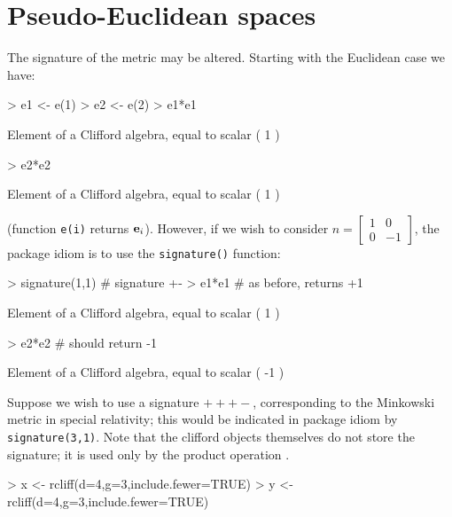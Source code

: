 \documentclass{birkjour}
\theoremstyle{definition}
\theoremstyle{remark}
\numberwithin{equation}{section}
\begin{document}
\section{Pseudo-Euclidean spaces}

The signature of the metric may be altered.  Starting with the
Euclidean case we have:
    
\begin{Schunk}
\begin{Sinput}
> e1 <- e(1)
> e2 <- e(2)
> e1*e1
\end{Sinput}
\begin{Soutput}
Element of a Clifford algebra, equal to
scalar ( 1 )
\end{Soutput}
\begin{Sinput}
> e2*e2
\end{Sinput}
\begin{Soutput}
Element of a Clifford algebra, equal to
scalar ( 1 )
\end{Soutput}
\end{Schunk}

(function {\tt e(i)} returns ${\bf e}_{i}$).  However, if we wish to
consider $n=\begin{bmatrix}1&0\\0&-1\end{bmatrix}$, the package idiom
is to use the {\tt signature()} function:

\begin{Schunk}
\begin{Sinput}
> signature(1,1)  # signature +-
> e1*e1 # as before, returns +1
\end{Sinput}
\begin{Soutput}
Element of a Clifford algebra, equal to
scalar ( 1 )
\end{Soutput}
\begin{Sinput}
> e2*e2 # should return -1
\end{Sinput}
\begin{Soutput}
Element of a Clifford algebra, equal to
scalar ( -1 )
\end{Soutput}
\end{Schunk}

Suppose we wish to use a signature $+++-$, corresponding to the
Minkowski metric in special relativity; this would be indicated in
package idiom by {\tt signature(3,1)}.  Note that the clifford objects
themselves do not store the signature; it is used only by the product
operation {\tt *}.

\begin{Schunk}
\begin{Sinput}
> x <- rcliff(d=4,g=3,include.fewer=TRUE)
> y <- rcliff(d=4,g=3,include.fewer=TRUE)
\end{Sinput}
\end{Schunk}
\end{document}
